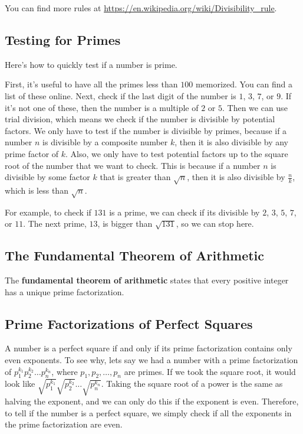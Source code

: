 \documentclass{article}
\begin{document}
\begin{multicols}{2}
	You can find more rules at \url{https://en.wikipedia.org/wiki/Divisibility_rule}.
	
	\subsection*{Testing for Primes}
	Here's how to quickly test if a number is prime.
	
	First, it's useful to have all the primes less than $100$ memorized.
	You can find a list of these online.
	Next, check if the last digit of the number is $1$, $3$, $7$, or $9$.
	If it's not one of these, then the number is a multiple of $2$ or $5$.
	Then we can use trial division, which means we check if the number is divisible by potential factors.
	We only have to test if the number is divisible by primes, because if a number $n$ is divisible by a composite number $k$, then it is also divisible by any prime factor of $k$.
	Also, we only have to test potential factors up to the square root of the number that we want to check.
	This is because if a number $n$ is divisible by some factor $k$ that is greater than $\sqrt{n}$, then it is also divisible by $\frac{n}{k}$, which is less than $\sqrt{n}$.
	
	For example, to check if $131$ is a prime, we can check if its divisible by $2$, $3$, $5$, $7$, or $11$.
	The next prime, $13$, is bigger than $\sqrt{131}$, so we can stop here.
	
	\subsection*{The Fundamental Theorem of Arithmetic}
	The \textbf{fundamental theorem of arithmetic} states that every positive integer has a unique prime factorization.
	
	\subsection*{Prime Factorizations of Perfect Squares}
	A number is a perfect square if and only if its prime factorization contains only even exponents.
	To see why, lets say we had a number with a prime factorization of $p_1^{k_1} p_2^{k_2} \dots p_n^{k_n}$, where $p_1, p_2, \dots, p_n$ are primes.
	If we took the square root, it would look like $\sqrt{p_1^{k_1}} \sqrt{p_2^{k_2}} \dots \sqrt{p_n^{k_n}}$.
	Taking the square root of a power is the same as halving the exponent, and we can only do this if the exponent is even.
	Therefore, to tell if the number is a perfect square, we simply check if all the exponents in the prime factorization are even.
	

\end{multicols}
\end{document}

